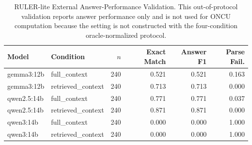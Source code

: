 \begin{table}[!t]
\renewcommand{\arraystretch}{1.10}
\caption{RULER-lite External Answer-Performance Validation. This out-of-protocol validation reports answer performance only and is not used for ONCU computation because the setting is not constructed with the four-condition oracle-normalized protocol.}
\label{tab:ruler_lite_external_validation}
\centering
\scriptsize
\setlength{\tabcolsep}{3pt}
\begin{tabular}{llrrrr}
\toprule
Model & Condition & $n$ & Exact Match & Answer F1 & Parse Fail. \\
\midrule
gemma3:12b & full\_context & 240 & 0.521 & 0.521 & 0.163 \\
gemma3:12b & retrieved\_context & 240 & 0.713 & 0.713 & 0.000 \\
qwen2.5:14b & full\_context & 240 & 0.771 & 0.771 & 0.037 \\
qwen2.5:14b & retrieved\_context & 240 & 0.871 & 0.871 & 0.000 \\
qwen3:14b & full\_context & 240 & 0.000 & 0.000 & 1.000 \\
qwen3:14b & retrieved\_context & 240 & 0.000 & 0.000 & 1.000 \\
\bottomrule
\end{tabular}
\end{table}
